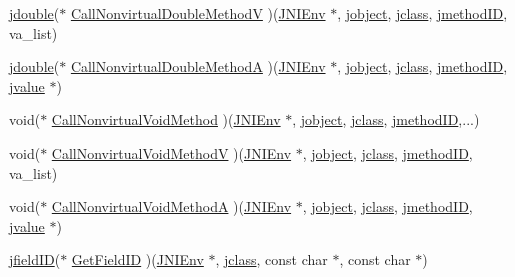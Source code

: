 \begin{DoxyCompactItemize}
\hyperlink{jni_8h_a4dbf307878725eebfb852c2800a951fa}{jdouble}($\ast$ \hyperlink{struct_j_n_i_native_interface_a01b4324809f511383dfdf5bdd7ad58ac}{Call\-Nonvirtual\-Double\-Method\-V} )(\hyperlink{jni_8h_a2d06d32b6b6f1519799078a36fe2e380}{J\-N\-I\-Env} $\ast$, \hyperlink{jni_8h_a24647d2a2f02c39f6338c2c6ce4c1004}{jobject}, \hyperlink{jni_8h_a5b236a554a9caf14a835f4e83b4c16b3}{jclass}, \hyperlink{jni_8h_a91d8a65fefade9d27c9f749e69f37c40}{jmethod\-I\-D}, va\-\_\-list)
\item 
\hyperlink{jni_8h_a4dbf307878725eebfb852c2800a951fa}{jdouble}($\ast$ \hyperlink{struct_j_n_i_native_interface_a8fd1eeab412d40742efc34a90fb8207b}{Call\-Nonvirtual\-Double\-Method\-A} )(\hyperlink{jni_8h_a2d06d32b6b6f1519799078a36fe2e380}{J\-N\-I\-Env} $\ast$, \hyperlink{jni_8h_a24647d2a2f02c39f6338c2c6ce4c1004}{jobject}, \hyperlink{jni_8h_a5b236a554a9caf14a835f4e83b4c16b3}{jclass}, \hyperlink{jni_8h_a91d8a65fefade9d27c9f749e69f37c40}{jmethod\-I\-D}, \hyperlink{unionjvalue}{jvalue} $\ast$)
\item 
void($\ast$ \hyperlink{struct_j_n_i_native_interface_a0ba310c330f22fc2adec0291a36ace32}{Call\-Nonvirtual\-Void\-Method} )(\hyperlink{jni_8h_a2d06d32b6b6f1519799078a36fe2e380}{J\-N\-I\-Env} $\ast$, \hyperlink{jni_8h_a24647d2a2f02c39f6338c2c6ce4c1004}{jobject}, \hyperlink{jni_8h_a5b236a554a9caf14a835f4e83b4c16b3}{jclass}, \hyperlink{jni_8h_a91d8a65fefade9d27c9f749e69f37c40}{jmethod\-I\-D},...)
\item 
void($\ast$ \hyperlink{struct_j_n_i_native_interface_a97dd0d756b978ab0f3f55a671a163ffa}{Call\-Nonvirtual\-Void\-Method\-V} )(\hyperlink{jni_8h_a2d06d32b6b6f1519799078a36fe2e380}{J\-N\-I\-Env} $\ast$, \hyperlink{jni_8h_a24647d2a2f02c39f6338c2c6ce4c1004}{jobject}, \hyperlink{jni_8h_a5b236a554a9caf14a835f4e83b4c16b3}{jclass}, \hyperlink{jni_8h_a91d8a65fefade9d27c9f749e69f37c40}{jmethod\-I\-D}, va\-\_\-list)
\item 
void($\ast$ \hyperlink{struct_j_n_i_native_interface_a76116656c90843ada0c2a18fdcfa794a}{Call\-Nonvirtual\-Void\-Method\-A} )(\hyperlink{jni_8h_a2d06d32b6b6f1519799078a36fe2e380}{J\-N\-I\-Env} $\ast$, \hyperlink{jni_8h_a24647d2a2f02c39f6338c2c6ce4c1004}{jobject}, \hyperlink{jni_8h_a5b236a554a9caf14a835f4e83b4c16b3}{jclass}, \hyperlink{jni_8h_a91d8a65fefade9d27c9f749e69f37c40}{jmethod\-I\-D}, \hyperlink{unionjvalue}{jvalue} $\ast$)
\item 
\hyperlink{jni_8h_a72513bd82c955054b04665c731aa662a}{jfield\-I\-D}($\ast$ \hyperlink{struct_j_n_i_native_interface_ac8fb9ac804e94b7e6d71efad3d8868cb}{Get\-Field\-I\-D} )(\hyperlink{jni_8h_a2d06d32b6b6f1519799078a36fe2e380}{J\-N\-I\-Env} $\ast$, \hyperlink{jni_8h_a5b236a554a9caf14a835f4e83b4c16b3}{jclass}, const char $\ast$, const char $\ast$)

\end{DoxyCompactItemize}
